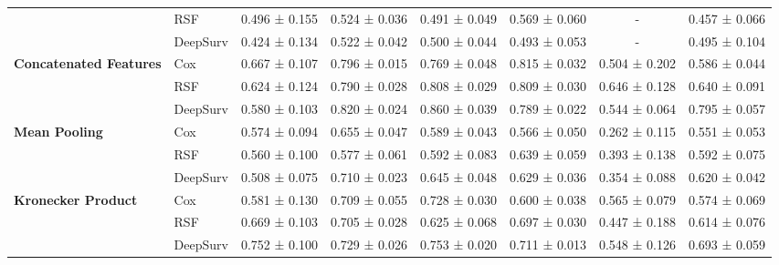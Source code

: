 \begin{sidewaystable}[htbp]
\begin{tabular}{@{}llcccccc@{}}
        & RSF & 0.496 ± 0.155 & 0.524 ± 0.036 & 0.491 ± 0.049 & 0.569 ± 0.060 & - & 0.457 ± 0.066 \\
        & DeepSurv & 0.424 ± 0.134 & 0.522 ± 0.042 & 0.500 ± 0.044 & 0.493 ± 0.053 & - & 0.495 ± 0.104 \\
        \midrule
        \multirow{3}{*}{\textbf{Concatenated Features}} & Cox & 0.667 ± 0.107 & 0.796 ± 0.015 & 0.769 ± 0.048 & 0.815 ± 0.032 & 0.504 ± 0.202 & 0.586 ± 0.044 \\
        & RSF & 0.624 ± 0.124 & 0.790 ± 0.028 & 0.808 ± 0.029 & 0.809 ± 0.030 & 0.646 ± 0.128 & 0.640 ± 0.091 \\
        & DeepSurv & 0.580 ± 0.103 & 0.820 ± 0.024 & 0.860 ± 0.039 & 0.789 ± 0.022 & 0.544 ± 0.064 & 0.795 ± 0.057 \\
        \midrule
        \multirow{3}{*}{\textbf{Mean Pooling}} & Cox & 0.574 ± 0.094 & 0.655 ± 0.047 & 0.589 ± 0.043 & 0.566 ± 0.050 & 0.262 ± 0.115 & 0.551 ± 0.053 \\
        & RSF & 0.560 ± 0.100 & 0.577 ± 0.061 & 0.592 ± 0.083 & 0.639 ± 0.059 & 0.393 ± 0.138 & 0.592 ± 0.075 \\
        & DeepSurv & 0.508 ± 0.075 & 0.710 ± 0.023 & 0.645 ± 0.048 & 0.629 ± 0.036 & 0.354 ± 0.088 & 0.620 ± 0.042 \\
        \midrule
        \multirow{3}{*}{\textbf{Kronecker Product}} & Cox & 0.581 ± 0.130 & 0.709 ± 0.055 & 0.728 ± 0.030 & 0.600 ± 0.038 & 0.565 ± 0.079 & 0.574 ± 0.069 \\
        & RSF & 0.669 ± 0.103 & 0.705 ± 0.028 & 0.625 ± 0.068 & 0.697 ± 0.030 & 0.447 ± 0.188 & 0.614 ± 0.076 \\
        & DeepSurv & 0.752 ± 0.100 & 0.729 ± 0.026 & 0.753 ± 0.020 & 0.711 ± 0.013 & 0.548 ± 0.126 & 0.693 ± 0.059 \\
        \bottomrule
    \end{tabular}
\end{sidewaystable}